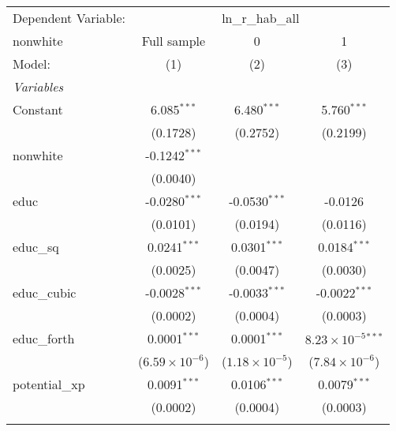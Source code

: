 \begingroup
\centering
\begin{tabular}{lccc}
   \tabularnewline \midrule \midrule
   Dependent Variable: & \multicolumn{3}{c}{ln\_r\_hab\_all}\\
   nonwhite                        & Full sample             & 0                       & 1 \\   
   Model:                          & (1)                     & (2)                     & (3)\\  
   \midrule
   \emph{Variables}\\
   Constant                        & 6.085$^{***}$           & 6.480$^{***}$           & 5.760$^{***}$\\   
                                   & (0.1728)                & (0.2752)                & (0.2199)\\   
   nonwhite                        & -0.1242$^{***}$         &                         &   \\   
                                   & (0.0040)                &                         &   \\   
   educ                            & -0.0280$^{***}$         & -0.0530$^{***}$         & -0.0126\\   
                                   & (0.0101)                & (0.0194)                & (0.0116)\\   
   educ\_sq                        & 0.0241$^{***}$          & 0.0301$^{***}$          & 0.0184$^{***}$\\   
                                   & (0.0025)                & (0.0047)                & (0.0030)\\   
   educ\_cubic                     & -0.0028$^{***}$         & -0.0033$^{***}$         & -0.0022$^{***}$\\   
                                   & (0.0002)                & (0.0004)                & (0.0003)\\   
   educ\_forth                     & 0.0001$^{***}$          & 0.0001$^{***}$          & $8.23\times 10^{-5}$$^{***}$\\    
                                   & ($6.59\times 10^{-6}$)  & ($1.18\times 10^{-5}$)  & ($7.84\times 10^{-6}$)\\    
   potential\_xp                   & 0.0091$^{***}$          & 0.0106$^{***}$          & 0.0079$^{***}$\\   
                                   & (0.0002)                & (0.0004)                & (0.0003)\\   
$$
\end{tabular}
